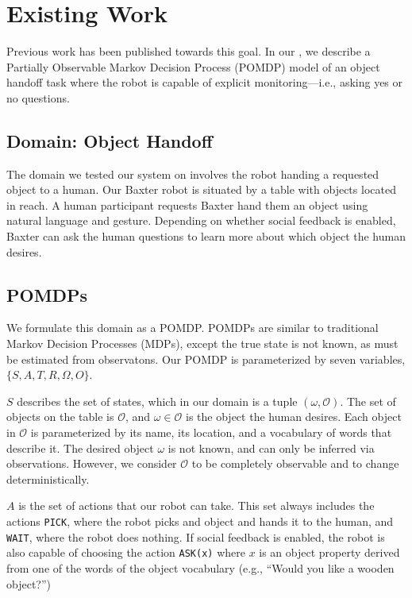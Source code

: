 \documentclass{article}
\begin{document}
\section{Existing Work}

Previous work has been published towards this goal. In our \citet{socialfeedback}, we describe a Partially Observable Markov Decision Process (POMDP) \citep{kaelbling10} model of an object handoff task where the robot is capable of explicit monitoring---i.e., asking yes or no questions. 
 
\subsection{Domain: Object Handoff}

The domain we tested our system on involves the robot handing a requested object to a human. Our Baxter robot is situated by a table with objects located in reach. A human participant requests Baxter hand them an object using natural language and gesture. Depending on whether social feedback is enabled, Baxter can ask the human questions to learn more about which object the human desires. 

\subsection{POMDPs}

We formulate this domain as a POMDP. POMDPs are similar to traditional Markov Decision Processes (MDPs), except the true state is not known, as must be estimated from observatons. Our POMDP is parameterized by seven variables, $\{S,A,T,R, \Omega, O\}$. 

$S$ describes the set of states, which in our domain is a tuple $(\omega, \mathcal{O})$. The set of objects on the table is $\mathcal{O}$, and $\omega \in \mathcal{O}$ is the object the human desires. Each object in $\mathcal{O}$ is parameterized by its name, its location, and a vocabulary of words that describe it. The desired object $\omega$ is not known, and can only be inferred via observations. However, we consider $\mathcal{O}$ to be completely observable and to change deterministically. 

$A$ is the set of actions that our robot can take. This set always includes the actions \texttt{PICK}, where the robot picks and object and hands it to the human, and \texttt{WAIT}, where the robot does nothing. If social feedback is enabled, the robot is also capable of choosing the action \texttt{ASK(x)} where $x$ is an object property derived from one of the words of the object vocabulary (e.g., ``Would you like a wooden object?'') 
\end{document}
